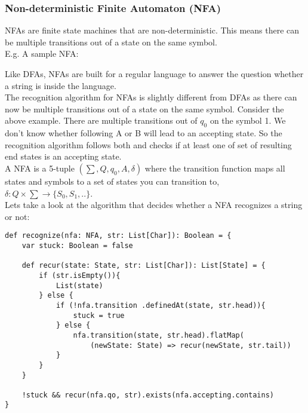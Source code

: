 \documentclass[12pt, letterpaper]{article}
\begin{document}
\subsubsection{Non-deterministic Finite Automaton (NFA)}
NFAs are finite state machines that are non-deterministic. This means there can be multiple transitions out of a state on the same symbol.\\

E.g. A sample NFA:

\begin{center}
\end{center}

Like DFAs, NFAs are built for a regular language to answer the question whether a string is inside the language.\\

The recognition algorithm for NFAs is slightly different from DFAs as there can now be multiple transitions out of a state on the same symbol. Consider the above example. There are multiple transitions out of \(q_0\) on the symbol 1. We don't know whether following A or B will lead to an accepting state. So the recognition algorithm follows both and checks if at least one of set of resulting end states is an accepting state.\\

A NFA is a 5-tuple \((\sum, Q, q_0, A, \delta)\) where the transition function maps all states and symbols to a set of states you can transition to, \(\delta: Q \times \sum \rightarrow \{S_0, S_1, ..\}\).\\

Lets take a look at the algorithm that decides whether a NFA recognizes a string or not:
\begin{lstlisting}
def recognize(nfa: NFA, str: List[Char]): Boolean = {
	var stuck: Boolean = false

	def recur(state: State, str: List[Char]): List[State] = {
		if (str.isEmpty()){
			List(state)
		} else {
			if (!nfa.transition	.definedAt(state, str.head)){
				stuck = true
			} else {
				nfa.transition(state, str.head).flatMap(
					(newState: State) => recur(newState, str.tail))
			}
		}
	}

	!stuck && recur(nfa.qo, str).exists(nfa.accepting.contains)
}
\end{lstlisting}
\end{document}
